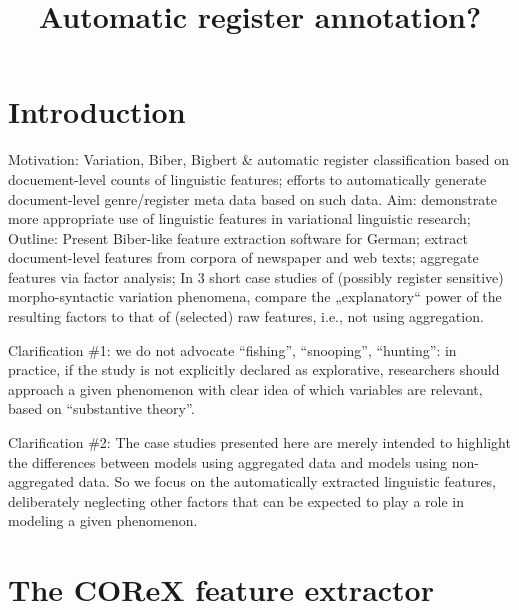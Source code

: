 \documentclass[11pt]{article}
\title{Automatic register annotation?}
\begin{document}
\maketitle

\section{Introduction}

Motivation: Variation, Biber, Bigbert \& automatic register classification based on docuement-level counts of linguistic features; efforts to automatically generate document-level genre/register meta data based on such data.
Aim: demonstrate more appropriate use of linguistic features in variational linguistic research;
Outline: Present Biber-like feature extraction software for German; extract document-level features from corpora of newspaper and web texts; aggregate features via factor analysis; 
In 3 short case studies of (possibly register sensitive) morpho-syntactic variation phenomena, compare the „explanatory“ power of the resulting factors to that of (selected) raw features, i.e., not using aggregation. 

Clarification \#1: we do not advocate ``fishing'', ``snooping'', ``hunting'': in practice, if the  study is not explicitly declared as explorative, researchers should approach a given phenomenon with clear idea of which variables are relevant, based on ``substantive theory''.

Clarification \#2: The case studies presented here are merely intended to highlight the differences between models using aggregated data and models using non-aggregated data. So we focus on the automatically extracted linguistic features, deliberately neglecting other factors that can be expected to play a role in modeling a given phenomenon.


\section{The COReX feature extractor}
\end{document}

